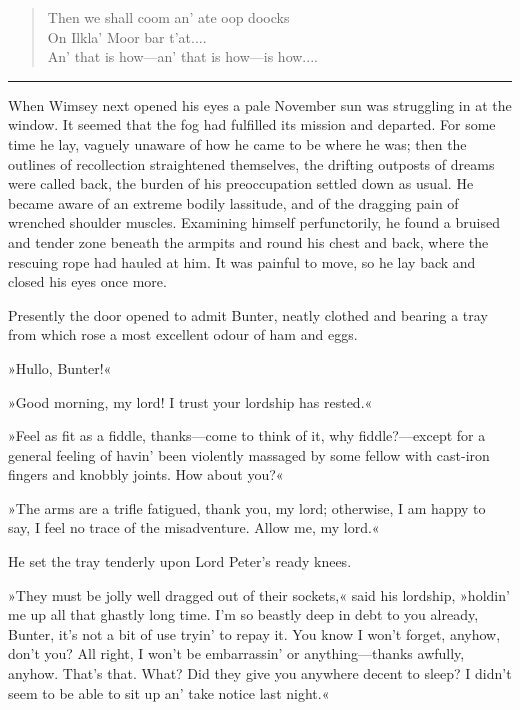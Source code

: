 \begin{verse}
\begin{altverse}
Then we shall coom an' ate oop doocks\\
On Ilkla' Moor bar t'at....\\
An' that is how—an' that is how—is how....\\
\end{altverse}
\end{verse}

\noindent\hfil\rule{0.5\textwidth}{.4pt}\hfil 

When Wimsey next opened his eyes a pale November sun was struggling in at the window. It seemed that the fog had fulfilled its mission and departed. For some time he lay, vaguely unaware of how he came to be where he was; then the outlines of recollection straightened themselves, the drifting outposts of dreams were called back, the burden of his preoccupation settled down as usual. He became aware of an extreme bodily lassitude, and of the dragging pain of wrenched shoulder muscles. Examining himself perfunctorily, he found a bruised and tender zone beneath the armpits and round his chest and back, where the rescuing rope had hauled at him. It was painful to move, so he lay back and closed his eyes once more.

Presently the door opened to admit Bunter, neatly clothed and bearing a tray from which rose a most excellent odour of ham and eggs.

»Hullo, Bunter!«

»Good morning, my lord! I trust your lordship has rested.«

»Feel as fit as a fiddle, thanks—come to think of it, why fiddle?—except for a general feeling of havin' been violently massaged by some fellow with cast-iron fingers and knobbly joints. How about you?«

»The arms are a trifle fatigued, thank you, my lord; otherwise, I am happy to say, I feel no trace of the misadventure. Allow me, my lord.«

He set the tray tenderly upon Lord Peter's ready knees.

»They must be jolly well dragged out of their sockets,« said his lordship, »holdin' me up all that ghastly long time. I'm so beastly deep in debt to you already, Bunter, it's not a bit of use tryin' to repay it. You know I won't forget, anyhow, don't you? All right, I won't be embarrassin' or anything—thanks awfully, anyhow. That's that.  What? Did they give you anywhere decent to sleep? I didn't seem to be able to sit up an' take notice last night.«

